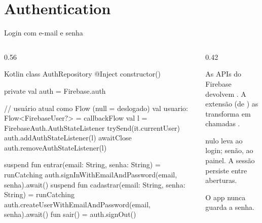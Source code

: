 \documentclass[aspectratio=169,10pt]{beamer}
\begin{document}
\section{Authentication}

\begin{frame}[fragile]{Login com e-mail e senha}
  \begin{columns}[T]
    \begin{column}{0.56\textwidth}
\begin{codigo}[title=AuthRepository.kt]{Kotlin}
class AuthRepository @Inject constructor() {
  private val auth = Firebase.auth

  // usuário atual como Flow (null = deslogado)
  val usuario: Flow<FirebaseUser?> = callbackFlow {
    val l = FirebaseAuth.AuthStateListener {
      trySend(it.currentUser)
    }
    auth.addAuthStateListener(l)
    awaitClose { auth.removeAuthStateListener(l) }
  }

  suspend fun entrar(email: String, senha: String) = runCatching {
    auth.signInWithEmailAndPassword(email, senha).await()
  }
  suspend fun cadastrar(email: String, senha: String) = runCatching {
    auth.createUserWithEmailAndPassword(email, senha).await()
  }
  fun sair() = auth.signOut()
}
\end{codigo}
    \end{column}
    \begin{column}{0.42\textwidth}
      \begin{conceito}
        As APIs do Firebase devolvem . A extensão  (de ) as transforma em chamadas .
      \end{conceito}
      \begin{dica}
         nulo leva ao login; senão, ao painel. A sessão persiste entre aberturas.
      \end{dica}
      \begin{atencao}
        O app nunca guarda a senha.
      \end{atencao}
    \end{column}
  \end{columns}
\end{frame}
\end{document}
